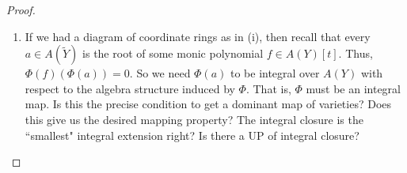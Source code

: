 \begin{proof}
\begin{enumerate}[label = (\alph*)]
\begin{enumerate}[label=(\roman*)]
            \item If we had a diagram of coordinate rings as in (i), then recall that every $a \in A(\widetilde Y)$ is the root of some monic polynomial $f \in A(Y)[t]$. Thus, $\Phi(f)(\Phi(a)) = 0$. So we need $\Phi(a)$ to be integral over $A(Y)$ with respect to the algebra structure induced by $\Phi$. That is, $\Phi$ must be an integral map. Is this the precise condition to get a dominant map of varieties? Does this give us the desired mapping property? The integral closure is the ``smallest" integral extension right? Is there a UP of integral closure?
        \end{enumerate}
    \end{enumerate}
\end{proof}                                                                                        
